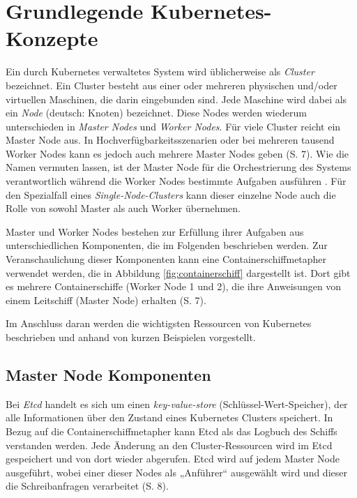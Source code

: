 \documentclass[11pt,a4paper]{article}
\begin{document}
\section{Grundlegende Kubernetes-Konzepte}
\label{sec:Grundlegende_Kubernetes-Konzepte}
Ein durch Kubernetes verwaltetes System wird üblicherweise als \emph{Cluster} bezeichnet.
Ein Cluster besteht aus einer oder mehreren physischen und/oder virtuellen Maschinen, die darin eingebunden sind.
Jede Maschine wird dabei als ein \emph{Node} (deutsch: Knoten) bezeichnet. Diese Nodes werden wiederum unterschieden in
\emph{Master Nodes} und \emph{Worker Nodes}.
Für viele Cluster reicht ein Master Node aus. In Hochverfügbarkeitsszenarien oder bei mehreren
tausend Worker Nodes kann es jedoch auch mehrere Master Nodes geben \cite{Schmeling_Dargatz_2022} (S. 7).
Wie die Namen vermuten lassen, ist der Master Node für die Orchestrierung
des Systems verantwortlich während die Worker Nodes bestimmte Aufgaben ausführen \cite{Bentaleb_Belloum_Sebaa_El-Maouhab_2021}.
Für den Spezialfall eines \emph{Single-Node-Clusters} kann dieser einzelne Node auch die Rolle von sowohl
Master als auch Worker übernehmen.

Master und Worker Nodes bestehen zur Erfüllung ihrer Aufgaben aus unterschiedlichen Komponenten,
die im Folgenden beschrieben werden.
Zur Veranschaulichung dieser Komponenten kann eine Containerschiffmetapher verwendet werden,
die in Abbildung \ref{fig:containerschiff} dargestellt ist. Dort gibt es mehrere Containerschiffe
(Worker Node 1 und 2), die ihre Anweisungen von einem Leitschiff (Master Node) erhalten \cite{Schmeling_Dargatz_2022} (S. 7).

Im Anschluss daran werden die wichtigsten Ressourcen
von Kubernetes beschrieben und anhand von kurzen Beispielen vorgestellt.


\subsection{Master Node Komponenten}
\label{sec:MasterNodeKomponenten}
Bei \emph{Etcd} handelt es sich um einen \emph{key-value-store} (Schlüssel-Wert-Speicher),
der alle Informationen über den Zustand eines Kubernetes Clusters speichert.
In Bezug auf die Containerschiffmetapher kann Etcd als das Logbuch des Schiffs verstanden werden.
Jede Änderung an den Cluster-Ressourcen wird im Etcd gespeichert und von dort wieder abgerufen.
Etcd wird auf jedem Master Node ausgeführt, wobei einer dieser Nodes als „Anführer“
ausgewählt wird und dieser die Schreibanfragen verarbeitet \cite{Schmeling_Dargatz_2022} (S. 8).
\end{document}
